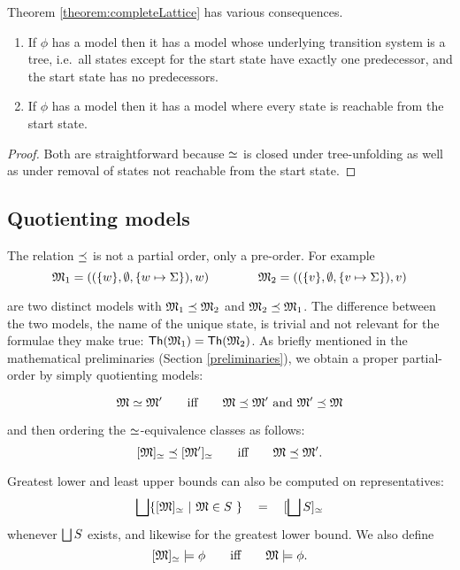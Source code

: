 Theorem \ref{theorem:completeLattice} has various
consequences.

\begin{corollary}
\begin{enumerate}

\item If $\phi$ has a model then it has a model whose underlying
  transition system is a tree, i.e.~all states except for the start state
  have exactly one predecessor, and the start state has no predecessors.

\item If $\phi$ has a model then it has a model where every state is
  reachable from the start state.

\end{enumerate}
\end{corollary}
\begin{proof}
Both are straightforward because $\simeq$ is closed under
tree-unfolding as well as under removal of states not reachable from
the start state.
\end{proof}


\subsection{Quotienting models}

\NI The relation $\preceq$ is not a partial order, only a
pre-order. For example 
\[
   \frak{M}_1 = ( (\{w\}, \emptyset, \{w \mapsto \Sigma\}), w)
      \qquad\qquad
   \frak{M}_2 = ( (\{v\}, \emptyset, \{v \mapsto \Sigma\}), v)
\]

\NI are two distinct models with $\frak{M}_1 \preceq \frak{M}_2$ and $\frak{M}_2
\preceq \frak{M}_1$. The difference between the two models, the name of
the unique state, is trivial and not relevant for the formulae they
make true: $\mathsf{Th}(\frak{M}_1) = \mathsf{Th}(\frak{M}_2)$.  As briefly mentioned
in the mathematical preliminaries (Section \ref{preliminaries}), we
obtain a proper partial-order by simply quotienting models:

\[
   \frak{M} \simeq \frak{M}'
      \qquad\text{iff}\qquad
   \frak{M} \preceq \frak{M}' \ \text{and}\ \frak{M}' \preceq \frak{M}
\]

\NI and then ordering the $\simeq$-equivalence classes as follows:
\[
    [\frak{M}]_{\simeq} \preceq [\frak{M}']_{\simeq}
      \qquad\text{iff}\qquad
    \frak{M} \preceq \frak{M}'.
\]

\NI Greatest lower and least upper bounds can also be computed on
representatives:
\[
   \bigsqcup \{[\frak{M}]_{\simeq} \ |\ \frak{M} \in S\ \} \quad=\quad [\bigsqcup S]_{\simeq}
\]
whenever $\bigsqcup S$ exists, and likewise for the greatest lower bound.
We also define 
\[
   [\frak{M}]_{\simeq} \models \phi 
      \qquad\text{iff}\qquad
   \frak{M} \models \phi.
\]

